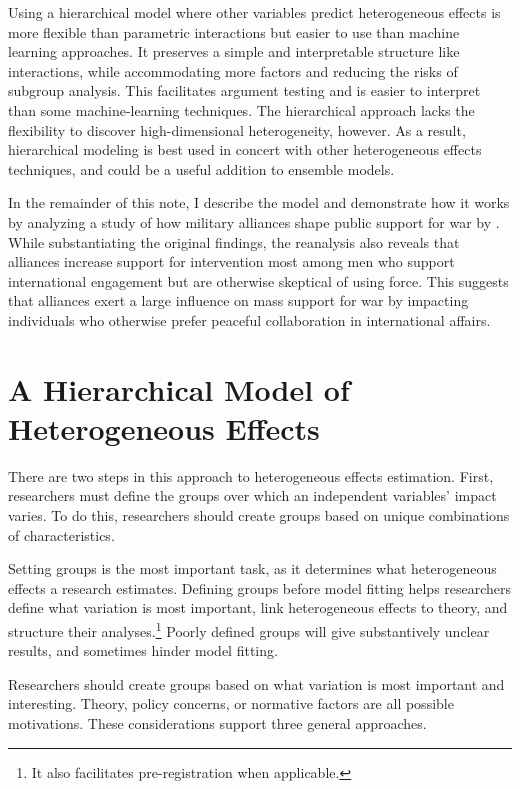 \documentclass[12pt]{article}
\begin{document}
 
Using a hierarchical model where other variables predict heterogeneous effects is more flexible than parametric interactions but easier to use than machine learning approaches.  
It preserves a simple and interpretable structure like interactions, while accommodating more factors and reducing the risks of subgroup analysis. 
This facilitates argument testing and is easier to interpret than some machine-learning techniques.
The hierarchical approach lacks the flexibility to discover high-dimensional heterogeneity, however.  
As a result, hierarchical modeling is best used in concert with other heterogeneous effects techniques, and could be a useful addition to ensemble models. 


In the remainder of this note, I describe the model and demonstrate how it works by analyzing a study of how military alliances shape public support for war by \citet{TomzWeeks2021}. 
While substantiating the original findings, the reanalysis also reveals that alliances increase support for intervention most among men who support international engagement but are otherwise skeptical of using force. 
This suggests that alliances exert a large influence on mass support for war by impacting individuals who otherwise prefer peaceful collaboration in international affairs. 



\section{A Hierarchical Model of Heterogeneous Effects}


There are two steps in this approach to heterogeneous effects estimation. 
First, researchers must define the groups over which an independent variables' impact varies. 
To do this, researchers should create groups based on unique combinations of characteristics.


Setting groups is the most important task, as it determines what heterogeneous effects a research estimates. 
Defining groups before model fitting helps researchers define what variation is most important, link heterogeneous effects to theory, and structure their analyses.\footnote{It also facilitates pre-registration when applicable.}
Poorly defined groups will give substantively unclear results, and sometimes hinder model fitting.   


Researchers should create groups based on what variation is most important and interesting. 
Theory, policy concerns, or normative factors are all possible motivations.
These considerations support three general approaches.  
\end{document}
